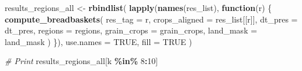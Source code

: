\documentclass[
  11pt,
]{article}
\newenvironment{Shaded}{\begin{snugshade}}{\end{snugshade}}
\newcommand{\AttributeTok}[1]{\textcolor[rgb]{0.13,0.29,0.53}{#1}}
\newcommand{\CommentTok}[1]{\textcolor[rgb]{0.56,0.35,0.01}{\textit{#1}}}
\newcommand{\ConstantTok}[1]{\textcolor[rgb]{0.56,0.35,0.01}{#1}}
\newcommand{\ControlFlowTok}[1]{\textcolor[rgb]{0.13,0.29,0.53}{\textbf{#1}}}
\newcommand{\DecValTok}[1]{\textcolor[rgb]{0.00,0.00,0.81}{#1}}
\newcommand{\FunctionTok}[1]{\textcolor[rgb]{0.13,0.29,0.53}{\textbf{#1}}}
\newcommand{\NormalTok}[1]{#1}
\newcommand{\OtherTok}[1]{\textcolor[rgb]{0.56,0.35,0.01}{#1}}
\newcommand{\SpecialCharTok}[1]{\textcolor[rgb]{0.81,0.36,0.00}{\textbf{#1}}}
\begin{document}
\begin{Shaded}
\begin{Highlighting}[]
\NormalTok{results\_regions\_all }\OtherTok{\textless{}{-}} \FunctionTok{rbindlist}\NormalTok{(}
  \FunctionTok{lapply}\NormalTok{(}\FunctionTok{names}\NormalTok{(res\_list), }\ControlFlowTok{function}\NormalTok{(r) \{}
    \FunctionTok{compute\_breadbaskets}\NormalTok{(}
      \AttributeTok{res\_tag =}\NormalTok{ r,}
      \AttributeTok{crops\_aligned =}\NormalTok{ res\_list[[r]],}
      \AttributeTok{dt\_pres =}\NormalTok{ dt\_pres,}
      \AttributeTok{regions =}\NormalTok{ regions,}
      \AttributeTok{grain\_crops =}\NormalTok{ grain\_crops,}
      \AttributeTok{land\_mask =}\NormalTok{ land\_mask}
\NormalTok{    )}
\NormalTok{  \}),}
  \AttributeTok{use.names =} \ConstantTok{TRUE}\NormalTok{,}
  \AttributeTok{fill =} \ConstantTok{TRUE}
\NormalTok{)}

\CommentTok{\# Print}
\NormalTok{results\_regions\_all[k }\SpecialCharTok{\%in\%} \DecValTok{8}\SpecialCharTok{:}\DecValTok{10}\NormalTok{]}
\end{Highlighting}
\end{Shaded}
\end{document}
